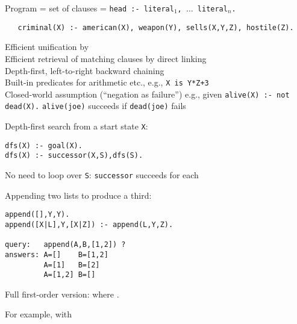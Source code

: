 \documentclass{article}
\begin{document}
\begin{huge}
Program = set of clauses = {\tt head :- literal$_1$, $\ldots$ literal$_n$.}
\begin{LARGE}\begin{verbatim}
   criminal(X) :- american(X), weapon(Y), sells(X,Y,Z), hostile(Z).
\end{verbatim}\end{LARGE}

Efficient unification by \\
Efficient retrieval of matching clauses by direct linking\\
Depth-first, left-to-right backward chaining\\
Built-in predicates for arithmetic etc., e.g., {\tt X is Y*Z+3}\\
Closed-world assumption (``negation as failure'')\al
   e.g., given {\tt alive(X) :- not dead(X).}\al
   {\tt alive(joe)} succeeds if {\tt dead(joe)} fails




Depth-first search from a start state {\tt X}:
\begin{verbatim}
dfs(X) :- goal(X).
dfs(X) :- successor(X,S),dfs(S).
\end{verbatim}
No need to loop over {\tt S}: {\tt successor} succeeds for each

Appending two lists to produce a third:
\begin{verbatim}
append([],Y,Y).                         
append([X|L],Y,[X|Z]) :- append(L,Y,Z). 
                                        
query:   append(A,B,[1,2]) ?            
answers: A=[]    B=[1,2]
         A=[1]   B=[2]
         A=[1,2] B=[]
\end{verbatim}





Full first-order version:
where .

For example,
with 


\end{huge}
\end{document}
